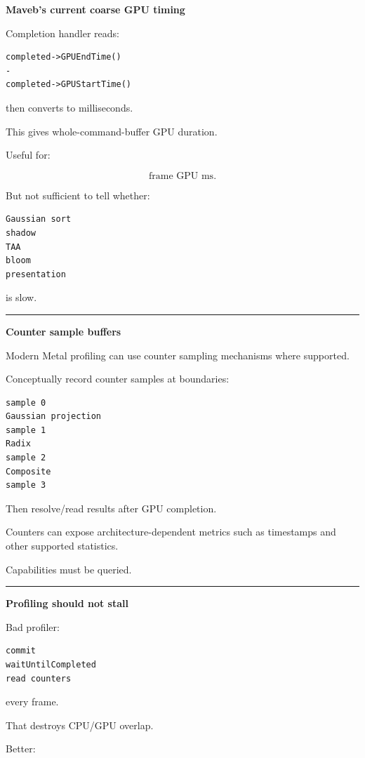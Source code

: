\textbf{Maveb's current coarse GPU timing}

Completion handler reads:

\begin{verbatim}
completed->GPUEndTime()
-
completed->GPUStartTime()
\end{verbatim}

then converts to milliseconds.

This gives whole-command-buffer GPU duration.

Useful for:

\[
\text{frame GPU ms}.
\]

But not sufficient to tell whether:

\begin{verbatim}
Gaussian sort
shadow
TAA
bloom
presentation
\end{verbatim}

is slow.

\begin{center}\rule{0.5\linewidth}{0.5pt}\end{center}

\textbf{Counter sample buffers}

Modern Metal profiling can use counter sampling mechanisms where supported.

Conceptually record counter samples at boundaries:

\begin{verbatim}
sample 0
Gaussian projection
sample 1
Radix
sample 2
Composite
sample 3
\end{verbatim}

Then resolve/read results after GPU completion.

Counters can expose architecture-dependent metrics such as timestamps and other supported statistics.

Capabilities must be queried.

\begin{center}\rule{0.5\linewidth}{0.5pt}\end{center}

\textbf{Profiling should not stall}

Bad profiler:

\begin{verbatim}
commit
waitUntilCompleted
read counters
\end{verbatim}

every frame.

That destroys CPU/GPU overlap.

Better:

